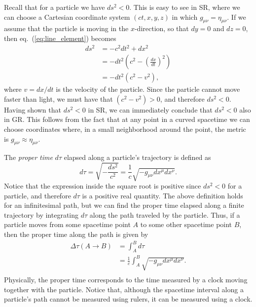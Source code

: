 Recall that for a particle we have $ds^2<0$. This is easy to see in SR, where we can choose a Cartesian coordinate system $(ct,x,y,z)$ in which $g_{\mu\nu}=\eta_{\mu\nu}$. If we assume that the particle is moving in the $x$-direction, so that $dy=0$ and $dz=0$, then eq.\ (\ref{eq:line_element}) becomes
\begin{equation}
\begin{split}
ds^2&=-c^2dt^2+dx^2\\
&=-dt^2\left(c^2-\left(\frac{dx}{dt}\right)^2\right)\\
&=-dt^2\left(c^2-v^2\right),
\end{split}
\end{equation}
where $v=dx/dt$ is the velocity of the particle. Since the particle cannot move faster than light, we must have that $(c^2-v^2)>0$, and therefore $ds^2<0$. Having shown that $ds^2<0$ in SR, we can immediately conclude that $ds^2<0$ also in GR. This follows from the fact that at any point in a curved spacetime we can choose coordinates where, in a small neighborhood around the point, the metric is $g_{\mu\nu}\approx\eta_{\mu\nu}$.

The {\it proper time} $d\tau$ elapsed along a particle's trajectory is defined as
\begin{equation} \label{eq:proper_time_dtau}
d\tau=\sqrt{-\frac{ds^2}{c^2}}=\frac{1}{c}\sqrt{-g_{\mu\nu}dx^{\mu}dx^{\nu}}.
\end{equation}
Notice that the expression inside the square root is positive since $ds^2<0$ for a particle, and therefore $d\tau$ is a positive real quantity. The above definition holds for an infinitesimal path, but we can find the proper time elapsed along a finite trajectory by integrating $d\tau$ along the path traveled by the particle. Thus, if a particle moves from some spacetime point $A$ to some other spacetime point $B$, then the proper time along the path is given by
\begin{equation}
\begin{split}
\Delta\tau(A\to B)&=\int_A^B d\tau\\
&=\frac{1}{c}\int_A^B \sqrt{-g_{\mu\nu}dx^{\mu}dx^{\nu}}.\\
\end{split}
\end{equation}
Physically, the proper time corresponds to the time measured by a clock moving together with the particle. Notice that, although the spacetime interval along a particle's path cannot be measured using rulers, it can be measured using a clock.

